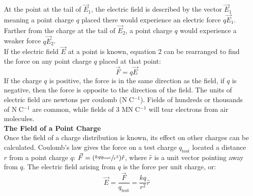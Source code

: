 \documentclass[a4paper]{article}
\let\bf\textbf
\begin{document}
At the point at the tail of $\vec{E}_1$, the electric field is described by the vector $\vec{E}_1$ meaning a point charge $q$ placed there would experience an electric force $q\vec{E}_1$. Farther from the charge at the tail of $\vec{E}_2$, a point charge $q$ would experience a weaker force $q\vec{E}_2$.
\vspace{1mm}\\
If the electric field $\vec{E}$ at a point is known, equation 2 can be rearranged to find the force on any point charge $q$ placed at that point:
\begin{equation*}
    \vec{F} = q\vec{E}
\end{equation*}
If the charge $q$ is positive, the force is in the same direction as the field, if $q$ is negative, then the force is opposite to the direction of the field. The units of electric field are newtons per coulomb (N$\;$C$^{-1}$). Fields of hundreds or thousands of N$\;$C$^{-1}$ are common, while fields of 3 MN$\;$C$^{-1}$ will tear electrons from air molecules.
\vspace{1mm}\\
\bf{The Field of a Point Charge}
\vspace{1mm}\\
Once the field of a charge distribution is known, its effect on other charges can be calculated. Coulomb's law gives the force on a test charge $q_{\text{test}}$ located a distance $r$ from a point charge $q$: $\vec{F} = (\sfrac{kqq_{\text{test}}}{r^2})\hat{r}$, where $\hat{r}$ is a unit vector pointing away from $q$. The electric field arising from $q$ is the force per unit charge, or:
\begin{equation}
    \vec{E} = \frac{\vec{F}}{q_{\text{test}}} = \frac{kq}{r^2}\hat{r}
\end{equation}
\end{document}
